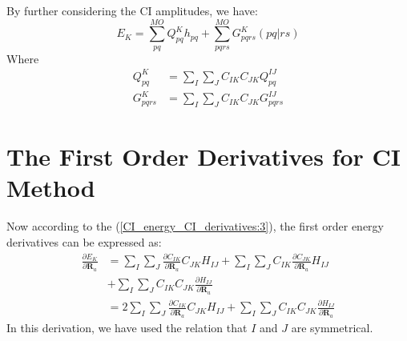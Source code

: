 By further considering the CI amplitudes, we have:
\begin{equation}
 \label{CI_energy_CI_derivatives:5}
E_{K} = \sum_{pq}^{MO}Q^{K}_{pq}h_{pq} + \sum_{pqrs}^{MO}G^{K}_{pqrs}(pq|rs)
\end{equation}
Where
\begin{align}
 \label{CI_energy_CI_derivatives:6}
Q^{K}_{pq} &= \sum_{I}\sum_{J}C_{IK}C_{JK}Q_{pq}^{IJ} \nonumber \\
G^{K}_{pqrs} &= \sum_{I}\sum_{J}C_{IK}C_{JK}G_{pqrs}^{IJ}
\end{align}


\section{The First Order Derivatives for CI Method}
%
%
%
%
Now according to the (\ref{CI_energy_CI_derivatives:3}), the first order energy
derivatives can be expressed as:
\begin{equation}
  \label{CI_1st_CI_derivatives:1}
\begin{split}
\frac{\partial E_{K}}{ \partial \bm{R}_{a}} &=
\sum_{I}\sum_{J}\frac{\partial C_{IK}}{\partial \bm{R}_{a}}C_{JK}H_{IJ} + 
\sum_{I}\sum_{J}C_{IK}\frac{\partial C_{JK}}{\partial \bm{R}_{a}}H_{IJ} \\
&+\sum_{I}\sum_{J}C_{IK}C_{JK}\frac{\partial H_{IJ} }{\partial \bm{R}_{a}}
\\ 
&= 2\sum_{I}\sum_{J}\frac{\partial C_{IK}}{\partial \bm{R}_{a}}C_{JK}H_{IJ} +
\sum_{I}\sum_{J}C_{IK}C_{JK}\frac{\partial H_{IJ} }{\partial \bm{R}_{a}}
\end{split}
\end{equation}
In this derivation, we have used the relation that $I$ and $J$ are symmetrical.

